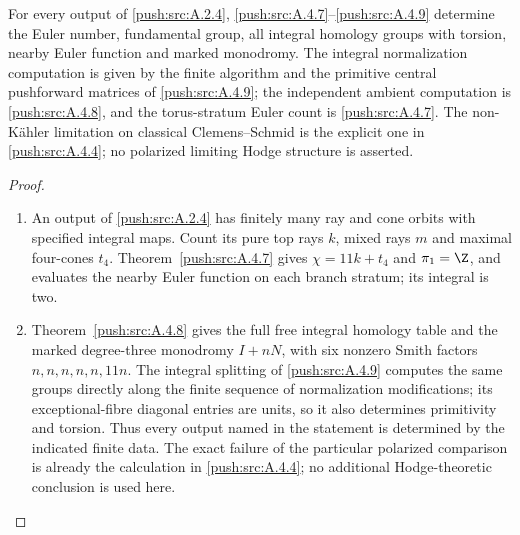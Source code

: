 \begin{corollary}\label{push:src:A.4.5}\label{push:A45}

For every output of \ref{push:src:A.2.4}, \ref{push:src:A.4.7}--\ref{push:src:A.4.9} determine the
Euler number, fundamental group, all integral homology
groups with torsion, nearby Euler function and marked
monodromy. The integral normalization computation is
given by the finite algorithm and the primitive
central pushforward matrices of \ref{push:src:A.4.9}; the independent
ambient computation is \ref{push:src:A.4.8}, and the torus-stratum
Euler count is \ref{push:src:A.4.7}. The non-K\"ahler limitation on
classical Clemens--Schmid is the explicit one in
\ref{push:src:A.4.4}; no polarized limiting Hodge structure is
asserted.
\end{corollary}

\begin{proof}
\begin{enumerate}[label=\arabic*.,leftmargin=*]
\item An output of \ref{push:src:A.2.4} has finitely many ray and
cone orbits with specified integral maps. Count its pure top
rays $k$, mixed rays $m$ and maximal four-cones $t_4$.
Theorem~\ref{push:src:A.4.7} gives $\chi=11k+t_4$ and
$\pi_1=\Z$, and evaluates the nearby Euler function on
each branch stratum; its integral is two.

\item Theorem~\ref{push:src:A.4.8} gives the full free integral
homology table and the marked degree-three monodromy $I+nN$,
with six nonzero Smith factors $n,n,n,n,n,11n$. The integral
splitting of \ref{push:src:A.4.9} computes the same groups
directly along the finite sequence of normalization modifications;
its exceptional-fibre diagonal entries are units, so it also
determines primitivity and torsion. Thus every output named in
the statement is determined by the indicated finite data.
The exact failure of the particular polarized comparison is
already the calculation in \ref{push:src:A.4.4}; no additional
Hodge-theoretic conclusion is used here.
\end{enumerate}
\end{proof}

